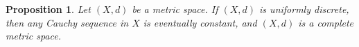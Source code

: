 \documentclass{article}
\newtheorem{thm}{Theorem}
\newtheorem{prop}[thm]{Proposition}
\numberwithin{thm}{section}
\newcommand{\adj}{\leftrightarrow}
\begin{document}
\begin{prop}
\label{eventuallyConst}
{\rm \cite{Bx20}}
Let $(X,d)$ be a metric space. 
If $(X,d)$ is uniformly discrete,
then any Cauchy sequence in $X$
is eventually constant, and $(X,d)$ is a complete metric space.
\end{prop}

\end{document}
